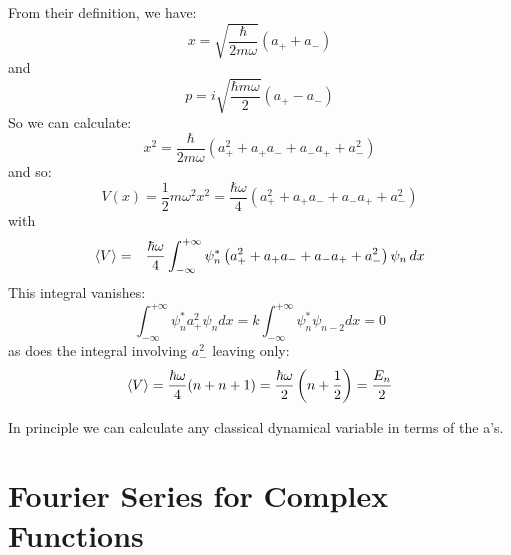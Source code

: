 \documentclass[12pt]{book}
\begin{document}
From their definition, we have:
\begin{equation*}
x = \sqrt{\frac{\hbar}{2m\omega}} \left( a_+ + a_-\right)
\end{equation*}
and 
\begin{equation*}
p = i\sqrt{\frac{\hbar m\omega}{2}} \left( a_+ - a_-\right)
\end{equation*}
So we can calculate:
\begin{equation*}
x^2 = \frac{\hbar}{2m\omega} \left( a_+^2 + a_+a_- + a_-a_+ + a_-^2 \right)
\end{equation*}
and so:
\begin{equation*}
V(x) = \frac{1}{2}m \omega^2 x^2= \frac{\hbar \omega}{4} \left( a_+^2 + a_+a_- + a_-a_+ + a_-^2 \right)
\end{equation*}
with
\begin{eqnarray*}
\braket{V} &=& \frac{\hbar \omega}{4} \int_{-\infty}^{+\infty} \psi_n^* \left( a_+^2 + a_+a_- + a_-a_+ + a_-^2 \right) \psi_n \, dx
\end{eqnarray*}
This integral vanishes:
$$\int_{-\infty}^{+\infty} \psi_n^* a_+^2 \psi_n dx = k \int_{-\infty}^{+\infty} \psi_n^* \psi_{n-2} dx
 = 0 $$
as does the integral involving $a_-^2$ leaving only:
\begin{equation*}
\braket{V} = \frac{\hbar \omega}{4} (n + n + 1) = \frac{\hbar \omega}{2} \left(n + \frac{1}{2}\right) 
= \frac{E_n}{2}
\end{equation*}

In principle we can calculate any classical dynamical variable in terms of the a's.


\section{Fourier Series for Complex Functions}
\end{document}
